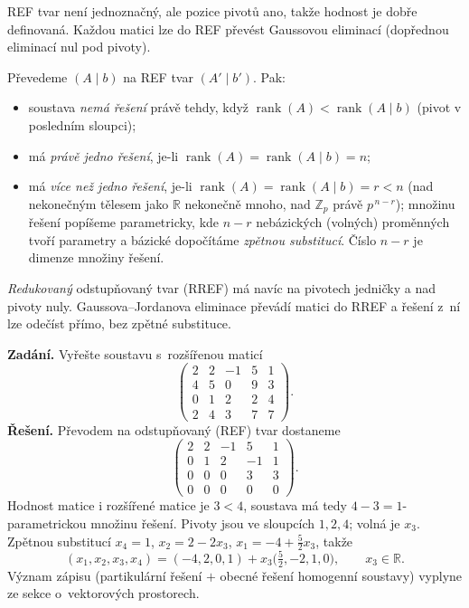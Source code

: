\documentclass[11pt,a4paper]{article}
\newcommand{\rank}{\operatorname{rank}}
\begin{document}
\begin{poznamka}
REF tvar není jednoznačný, ale pozice pivotů ano, takže hodnost je dobře definovaná. Každou matici lze do REF převést Gaussovou eliminací (dopřednou eliminací nul pod pivoty).
\end{poznamka}

\begin{veta}
Převedeme $(A\mid b)$ na REF tvar $(A'\mid b')$. Pak:
\begin{itemize}
  \item soustava \emph{nemá řešení} právě tehdy, když $\rank(A)<\rank(A\mid b)$ (pivot v posledním sloupci);
  \item má \emph{právě jedno řešení}, je-li $\rank(A)=\rank(A\mid b)=n$;
  \item má \emph{více než jedno řešení}, je-li $\rank(A)=\rank(A\mid b)=r<n$ (nad nekonečným tělesem jako $\mathbb{R}$ nekonečně mnoho, nad $\mathbb{Z}_p$ právě $p^{\,n-r}$); množinu řešení popíšeme parametricky, kde $n-r$ nebázických (volných) proměnných tvoří parametry a bázické dopočítáme \emph{zpětnou substitucí}. Číslo $n-r$ je dimenze množiny řešení.
\end{itemize}
\end{veta}

\begin{poznamka}
\emph{Redukovaný} odstupňovaný tvar (RREF) má navíc na pivotech jedničky a nad pivoty nuly. Gaussova--Jordanova eliminace převádí matici do RREF a řešení z~ní lze odečíst přímo, bez zpětné substituce.
\end{poznamka}

\begin{priklad}
\textbf{Zadání.} Vyřešte soustavu s~rozšířenou maticí
\[ \begin{pmatrix} 2&2&-1&5&1\\ 4&5&0&9&3\\ 0&1&2&2&4\\ 2&4&3&7&7 \end{pmatrix}. \]
\textbf{Řešení.} Převodem na odstupňovaný (REF) tvar dostaneme
\[ \begin{pmatrix} 2&2&-1&5&1\\ 0&1&2&-1&1\\ 0&0&0&3&3\\ 0&0&0&0&0 \end{pmatrix}. \]
Hodnost matice i rozšířené matice je $3<4$, soustava má tedy $4-3=1$-parametrickou množinu řešení. Pivoty jsou ve sloupcích $1,2,4$; volná je $x_3$. Zpětnou substitucí $x_4=1$, $x_2=2-2x_3$, $x_1=-4+\tfrac52 x_3$, takže
\[
  (x_1,x_2,x_3,x_4)=(-4,2,0,1)+x_3\bigl(\tfrac52,-2,1,0\bigr),\qquad x_3\in\mathbb{R}.
\]
Význam zápisu (partikulární řešení $+$ obecné řešení homogenní soustavy) vyplyne ze sekce o~vektorových prostorech.
\end{priklad}
\end{document}
